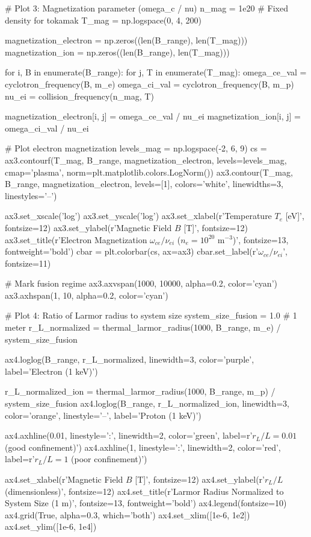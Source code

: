 \documentclass[11pt,a4paper]{article}
\begin{document}
\begin{pycode}
# Plot 3: Magnetization parameter (omega_c / nu)
n_mag = 1e20  # Fixed density for tokamak
T_mag = np.logspace(0, 4, 200)

magnetization_electron = np.zeros((len(B_range), len(T_mag)))
magnetization_ion = np.zeros((len(B_range), len(T_mag)))

for i, B in enumerate(B_range):
    for j, T in enumerate(T_mag):
        omega_ce_val = cyclotron_frequency(B, m_e)
        omega_ci_val = cyclotron_frequency(B, m_p)
        nu_ei = collision_frequency(n_mag, T)

        magnetization_electron[i, j] = omega_ce_val / nu_ei
        magnetization_ion[i, j] = omega_ci_val / nu_ei

# Plot electron magnetization
levels_mag = np.logspace(-2, 6, 9)
cs = ax3.contourf(T_mag, B_range, magnetization_electron,
                  levels=levels_mag, cmap='plasma',
                  norm=plt.matplotlib.colors.LogNorm())
ax3.contour(T_mag, B_range, magnetization_electron, levels=[1],
           colors='white', linewidths=3, linestyles='--')

ax3.set_xscale('log')
ax3.set_yscale('log')
ax3.set_xlabel(r'Temperature $T_e$ [eV]', fontsize=12)
ax3.set_ylabel(r'Magnetic Field $B$ [T]', fontsize=12)
ax3.set_title(r'Electron Magnetization $\omega_{ce}/\nu_{ei}$ ($n_e = 10^{20}$ m$^{-3}$)',
             fontsize=13, fontweight='bold')
cbar = plt.colorbar(cs, ax=ax3)
cbar.set_label(r'$\omega_{ce}/\nu_{ei}$', fontsize=11)

# Mark fusion regime
ax3.axvspan(1000, 10000, alpha=0.2, color='cyan')
ax3.axhspan(1, 10, alpha=0.2, color='cyan')

# Plot 4: Ratio of Larmor radius to system size
system_size_fusion = 1.0  # 1 meter
r_L_normalized = thermal_larmor_radius(1000, B_range, m_e) / system_size_fusion

ax4.loglog(B_range, r_L_normalized, linewidth=3, color='purple', label='Electron (1 keV)')

r_L_normalized_ion = thermal_larmor_radius(1000, B_range, m_p) / system_size_fusion
ax4.loglog(B_range, r_L_normalized_ion, linewidth=3, color='orange',
          linestyle='--', label='Proton (1 keV)')

ax4.axhline(0.01, linestyle=':', linewidth=2, color='green',
           label=r'$r_L/L = 0.01$ (good confinement)')
ax4.axhline(1, linestyle=':', linewidth=2, color='red',
           label=r'$r_L/L = 1$ (poor confinement)')

ax4.set_xlabel(r'Magnetic Field $B$ [T]', fontsize=12)
ax4.set_ylabel(r'$r_L / L$ (dimensionless)', fontsize=12)
ax4.set_title(r'Larmor Radius Normalized to System Size (1 m)', fontsize=13, fontweight='bold')
ax4.legend(fontsize=10)
ax4.grid(True, alpha=0.3, which='both')
ax4.set_xlim([1e-6, 1e2])
ax4.set_ylim([1e-6, 1e4])


\end{pycode}
\end{document}

